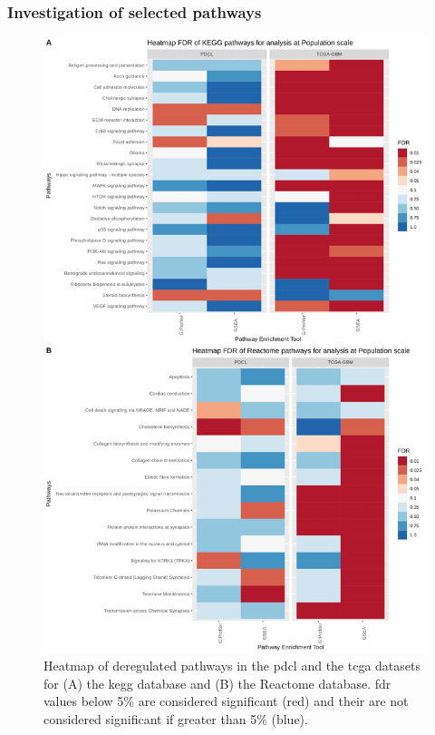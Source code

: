 \subsubsection{Investigation of selected pathways}

\begin{figure}
    \begin{center}
        \includegraphics[height=0.7\paperheight]{img/heatmap-fdr-global}
        \caption{
            Heatmap of deregulated pathways in the \acrshort{pdcl} and the \acrshort{tcga} datasets for (A) the \acrshort{kegg} database and (B) the Reactome database.
            \acrshort{fdr} values below 5\% are considered significant (red) and their are not considered significant if greater than 5\% (blue).
        }
        \label{fig:heatmap-fdr-global}
    \end{center}
\end{figure}

